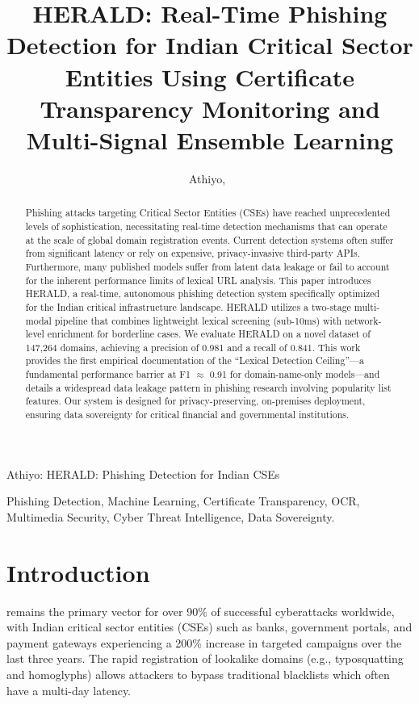 \documentclass[journal]{IEEEtran}
\begin{document}
\title{HERALD: Real-Time Phishing Detection for Indian Critical Sector Entities Using Certificate Transparency Monitoring and Multi-Signal Ensemble Learning}

\author{Athiyo,~}

%
{Athiyo: HERALD: Phishing Detection for Indian CSEs}

\maketitle

\begin{abstract}
Phishing attacks targeting Critical Sector Entities (CSEs) have reached unprecedented levels of sophistication, necessitating real-time detection mechanisms that can operate at the scale of global domain registration events. Current detection systems often suffer from significant latency or rely on expensive, privacy-invasive third-party APIs. Furthermore, many published models suffer from latent data leakage or fail to account for the inherent performance limits of lexical URL analysis. This paper introduces HERALD, a real-time, autonomous phishing detection system specifically optimized for the Indian critical infrastructure landscape. HERALD utilizes a two-stage multi-modal pipeline that combines lightweight lexical screening (sub-10ms) with network-level enrichment for borderline cases. We evaluate HERALD on a novel dataset of 147,264 domains, achieving a precision of 0.981 and a recall of 0.841. This work provides the first empirical documentation of the ``Lexical Detection Ceiling''---a fundamental performance barrier at F1 $\approx$ 0.91 for domain-name-only models---and details a widespread data leakage pattern in phishing research involving popularity list features. Our system is designed for privacy-preserving, on-premises deployment, ensuring data sovereignty for critical financial and governmental institutions.
\end{abstract}

\begin{IEEEkeywords}
Phishing Detection, Machine Learning, Certificate Transparency, OCR, Multimedia Security, Cyber Threat Intelligence, Data Sovereignty.
\end{IEEEkeywords}

\section{Introduction}
 remains the primary vector for over 90\% of successful cyberattacks worldwide, with Indian critical sector entities (CSEs) such as banks, government portals, and payment gateways experiencing a 200\% increase in targeted campaigns over the last three years. The rapid registration of lookalike domains (e.g., typosquatting and homoglyphs) allows attackers to bypass traditional blacklists which often have a multi-day latency. 
\end{document}
